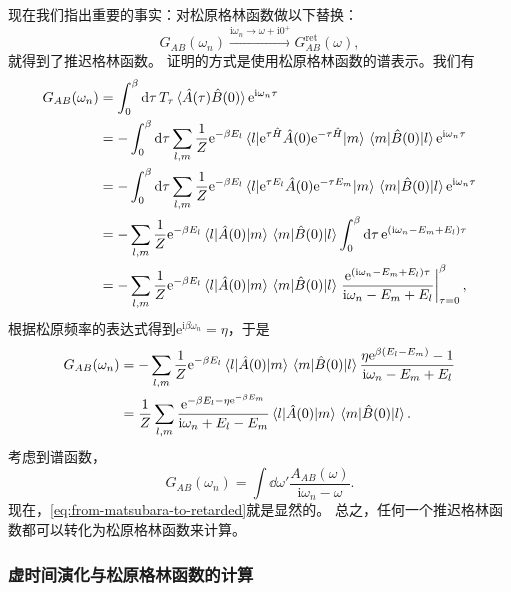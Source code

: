 \documentclass[hyperref, UTF8, a4paper]{ctexart}
\newcommand*{\ii}{\mathrm{i}}
\newcommand*{\ee}{\mathrm{e}}
\begin{document}
现在我们指出重要的事实：对松原格林函数做以下替换：
\begin{equation}
    G_{AB}(\omega_n) \xrightarrow{\ii \omega_n \longrightarrow \omega+\ii 0^+} G_{AB}^\text{ret} (\omega),
    \label{eq:from-matsubara-to-retarded}
\end{equation}
就得到了推迟格林函数。
证明的方式是使用松原格林函数的谱表示。我们有
\[
    \begin{aligned}
        G_{AB} (\omega_n) &= \int_0^\beta \dd{\tau} T_\tau \expval*{\hat{A}(\tau) \hat{B}(0)} \ee^{\ii \omega_n \tau} \\
        &= - \int_0^\beta \dd{\tau} \sum_{l, m} \frac{1}{Z} \ee^{-\beta E_l} \mel{l}{\ee^{\tau \hat{H}} \hat{A}(0) \ee^{- \tau \hat{H}}}{m} \mel{m}{\hat{B}(0)}{l} \ee^{\ii \omega_n \tau} \\
        &= - \int_0^\beta \dd{\tau} \sum_{l, m} \frac{1}{Z} \ee^{-\beta E_l} \mel{l}{\ee^{\tau E_l} \hat{A}(0) \ee^{- \tau E_m}}{m} \mel{m}{\hat{B}(0)}{l} \ee^{\ii \omega_n \tau} \\
        &= - \sum_{l, m} \frac{1}{Z} \ee^{-\beta E_l} \mel{l}{\hat{A}(0)}{m} \mel{m}{\hat{B}(0)}{l} \int_0^\beta \dd{\tau} \ee^{(\ii \omega_n - E_m + E_l) \tau} \\
        &= - \sum_{l, m} \frac{1}{Z} \ee^{-\beta E_l} \mel{l}{\hat{A}(0)}{m} \mel{m}{\hat{B}(0)}{l} \eval{\frac{\ee^{(\ii \omega_n - E_m + E_l) \tau}}{\ii \omega_n - E_m + E_l}}_{\tau=0}^\beta,
    \end{aligned}
\]
根据松原频率的表达式得到$\ee^{\ii \beta \omega_n} = \eta$，于是
\[
    \begin{aligned}
        G_{AB} (\omega_n) &= - \sum_{l, m} \frac{1}{Z} \ee^{-\beta E_l} \mel{l}{\hat{A}(0)}{m} \mel{m}{\hat{B}(0)}{l} \frac{\eta \ee^{\beta (E_l - E_m)} - 1}{\ii \omega_n - E_m + E_l} \\
        &= \frac{1}{Z} \sum_{l, m} \frac{\ee^{-\beta E_l - \eta \ee^{- \beta E_m}}}{\ii \omega_n + E_l - E_m} \mel{l}{\hat{A}(0)}{m} \mel{m}{\hat{B}(0)}{l}.
    \end{aligned}
\]
考虑到谱函数，
\begin{equation}
    G_{AB} (\omega_n) = \int \dd{\omega'} \frac{A_{AB}(\omega)}{\ii \omega_n - \omega}.
\end{equation}
现在，\eqref{eq:from-matsubara-to-retarded}就是显然的。
总之，任何一个推迟格林函数都可以转化为松原格林函数来计算。

\subsubsection{虚时间演化与松原格林函数的计算}
\end{document}
